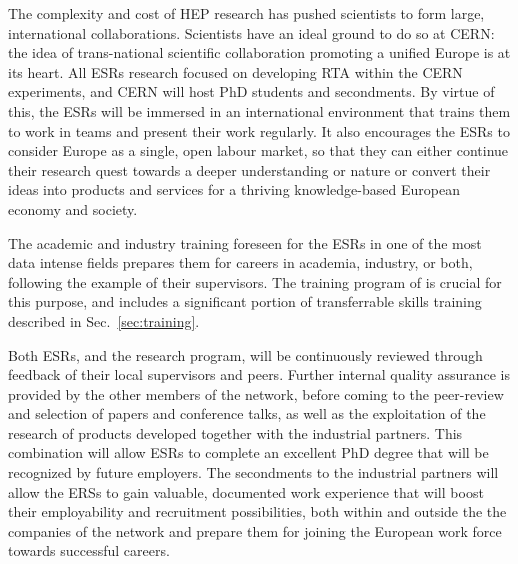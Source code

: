 \noindent\color{blue}{International networking. }\color{black}
The complexity and cost of HEP research has pushed scientists to form large, 
international collaborations. Scientists have an ideal ground to do so at CERN: 
the idea of trans-national scientific collaboration promoting a unified Europe
is at its heart.
All \acronym ESRs research focused on developing RTA within the 
CERN experiments, and CERN will host PhD students and secondments. 
By virtue of this, the ESRs will be immersed in an
international environment that trains them to work in teams and present their work regularly.
It also encourages the ESRs to consider Europe as a single, open labour market,
so that they can either continue their research quest towards a deeper understanding or nature
or convert their ideas into products and services for a thriving knowledge-based European
economy and society. 

\noindent\color{blue}{Transferable skills training. }\color{black}
The academic and industry training foreseen for the 
ESRs in one of the most data intense fields
prepares them for careers in academia, industry, or both, 
following the example of their supervisors. The training program of \acronym
is crucial for this purpose, and includes a significant portion of transferrable skills training
described in Sec.~\ref{sec:training}.

\noindent\color{blue}{Quality Assurance. }\color{black}
Both ESRs, and the \acronym research program, will be continuously reviewed 
through feedback of their local supervisors and peers. Further internal quality assurance is
provided by the other members of the network, before coming to the peer-review
and selection of papers and conference talks, as well as the exploitation of the research
of products developed together with the industrial partners. 
This combination will allow \acronym ESRs to complete an excellent PhD degree 
that will be recognized by future employers. The secondments to the industrial partners will
allow the ERSs to gain valuable, documented work experience that will boost
their employability and recruitment possibilities, 
both within and outside the the companies of the network
and prepare them for joining the European work force towards successful careers. 

%
%


